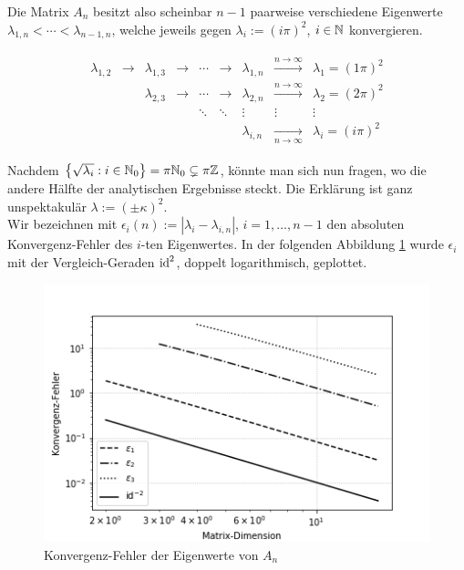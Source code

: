 

Die Matrix $A_n$ besitzt also scheinbar $n-1$ paarweise verschiedene Eigenwerte $\lambda_{1, n} < \cdots < \lambda_{n-1, n}$, welche jeweils gegen $\lambda_i := (i \pi)^2$, $i \in \mathbb{N}$ konvergieren.

\begin{align} \label{Konvergenz_EW}
\begin{array}{ccccccccc}
\lambda_{1, 2} & \rightarrow & \lambda_{1, 3} & \rightarrow & \cdots & \rightarrow & \lambda_{1, n} & \xrightarrow{n \to \infty}   & \lambda_1 = (1 \pi)^2 \\
               &             & \lambda_{2, 3} & \rightarrow & \cdots & \rightarrow & \lambda_{2, n} & \xrightarrow{n \to \infty}   & \lambda_2 = (2 \pi)^2 \\
               &             &                &             & \ddots & \ddots      & \vdots         & \vdots                       & \vdots                \\
               &             &                &             &        &             & \lambda_{i, n} & \xrightarrow[n \to \infty]{} & \lambda_i = (i \pi)^2
\end{array}
\end{align}

Nachdem ${\left \{ \sqrt{\lambda_i}: i \in \mathbb{N}_0 \right \}} = \pi \mathbb{N}_0 \subsetneq \pi \mathbb{Z}$, könnte man sich nun fragen, wo die andere Hälfte der analytischen Ergebnisse steckt. Die Erklärung ist ganz unspektakulär $\lambda := (\pm \kappa)^2$. \\

Wir bezeichnen mit $\epsilon_i(n) := |\lambda_i - \lambda_{i, n}|$, $i = 1, \ldots, n-1$ den absoluten Konvergenz-Fehler des $i$-ten Eigenwertes. In der folgenden Abbildung \ref{fig:Konvergenz-Fehler_EW} wurde $\epsilon_i$ mit der Vergleich-Geraden $\text{id}^2$, doppelt logarithmisch, geplottet. \\

\begin{figure}[H]
  \centering
  \includegraphics[width = 0.5 \textwidth]{Aufgabe_2/images/plot_eigen_value_errors(n_max = 16, i_max = 3)}
  \caption{Konvergenz-Fehler der Eigenwerte von $A_n$}
  \label{fig:Konvergenz-Fehler_EW}
\end{figure}

